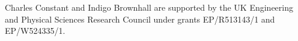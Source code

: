 \documentclass{agujournal2019}
\begin{document}
\acknowledgments
Charles Constant and Indigo Brownhall are supported by the UK Engineering and Physical Sciences Research Council under grants EP/R513143/1 and EP/W524335/1.

%

%

%

%
%
%
%
%
\end{document}
